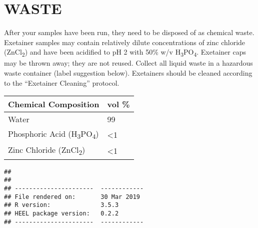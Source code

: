 \documentclass[]{article}
\begin{document}
\section{WASTE}\label{waste}

After your samples have been run, they need to be disposed of as
chemical waste. Exetainer samples may contain relatively dilute
concentrations of zinc chloride (ZnCl\textsubscript{2}) and have been
acidified to pH 2 with 50\% w/v H\textsubscript{3}PO\textsubscript{4}.
Exetainer caps may be thrown away; they are not reused. Collect all
liquid waste in a hazardous waste container (label suggestion below).
Exetainers should be cleaned according to the ``Exetainer Cleaning''
protocol.

\begin{longtable}[]{@{}ll@{}}
\toprule
Chemical Composition & vol \%\tabularnewline
\midrule
\endhead
Water & 99\tabularnewline
Phosphoric Acid (H\textsubscript{3}PO\textsubscript{4}) &
\textless{}1\tabularnewline
Zinc Chloride (ZnCl\textsubscript{2}) & \textless{}1\tabularnewline
\bottomrule
\end{longtable}

\begin{verbatim}
## 
## 
## ----------------------  ------------
## File rendered on:       30 Mar 2019 
## R version:              3.5.3       
## HEEL package version:   0.2.2       
## ----------------------  ------------
\end{verbatim}
\end{document}
